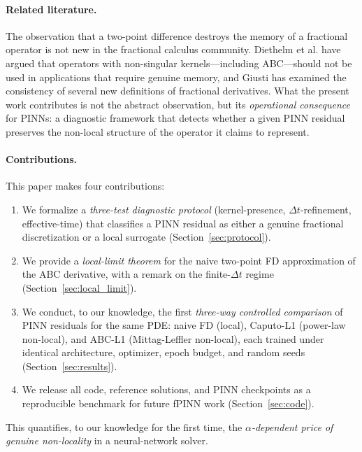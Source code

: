 \documentclass[11pt]{article}
\begin{document}
\paragraph{Related literature.}
The observation that a two-point difference destroys the memory of a fractional operator is not new in the fractional calculus community. Diethelm et al. \cite{Diethelm2020} have argued that operators with non-singular kernels---including ABC---should not be used in applications that require genuine memory, and Giusti \cite{Giusti2018} has examined the consistency of several new definitions of fractional derivatives. What the present work contributes is not the abstract observation, but its \emph{operational consequence} for PINNs: a diagnostic framework that detects whether a given PINN residual preserves the non-local structure of the operator it claims to represent.

\paragraph{Contributions.}
This paper makes four contributions:
\begin{enumerate}[label=(\roman*)]
\item We formalize a \emph{three-test diagnostic protocol} (kernel-presence, \(\Delta t\)-refinement, effective-time) that classifies a PINN residual as either a genuine fractional discretization or a local surrogate (Section~\ref{sec:protocol}).
\item We provide a \emph{local-limit theorem} for the naive two-point FD approximation of the ABC derivative, with a remark on the finite-\(\Delta t\) regime (Section~\ref{sec:local_limit}).
\item We conduct, to our knowledge, the first \emph{three-way controlled comparison} of PINN residuals for the same PDE: naive FD (local), Caputo-L1 (power-law non-local), and ABC-L1 (Mittag-Leffler non-local), each trained under identical architecture, optimizer, epoch budget, and random seeds (Section~\ref{sec:results}).
\item We release all code, reference solutions, and PINN checkpoints as a reproducible benchmark for future fPINN work (Section~\ref{sec:code}).
\end{enumerate}

This quantifies, to our knowledge for the first time, the \emph{\(\alpha\)-dependent price of genuine non-locality} in a neural-network solver.

\end{document}
